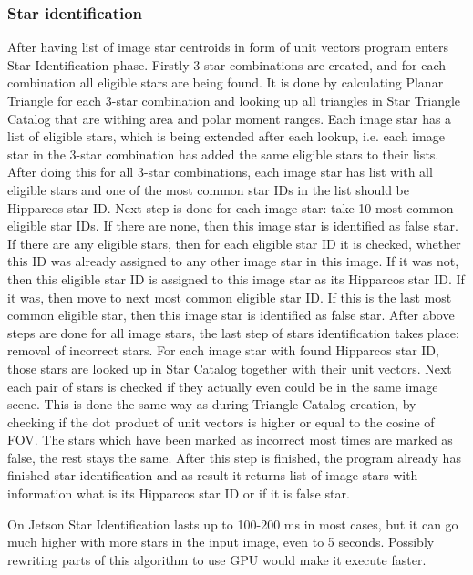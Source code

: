 \documentclass[12pt,a4paper,twoside]{article}
\begin{document}
\subsubsection{Star identification}
After having list of image star centroids in form of unit vectors program enters Star Identification phase. Firstly 3-star combinations are created, and for each combination all eligible stars are being found. It is done by calculating Planar Triangle for each 3-star combination and looking up all triangles in Star Triangle Catalog that are withing area and polar moment ranges. Each image star has a list of eligible stars, which is being extended after each lookup, i.e. each image star in the 3-star combination has added the same eligible stars to their lists. After doing this for all 3-star combinations, each image star has list with all eligible stars and one of the most common star IDs in the list should be Hipparcos star ID. Next step is done for each image star: take 10 most common eligible star IDs. If there are none, then this image star is identified as false star. If there are any eligible stars, then for each eligible star ID it is checked, whether this ID was already assigned to any other image star in this image. If it was not, then this eligible star ID is assigned to this image star as its Hipparcos star ID. If it was, then move to next most common eligible star ID. If this is the last most common eligible star, then this image star is identified as false star. After above steps are done for all image stars, the last step of stars identification takes place: removal of incorrect stars. For each image star with found Hipparcos star ID, those stars are looked up in Star Catalog together with their unit vectors. Next each pair of stars is checked if they actually even could be in the same image scene. This is done the same way as during Triangle Catalog creation, by checking if the dot product of unit vectors is higher or equal to the cosine of FOV. The stars which have been marked as incorrect most times are marked as false, the rest stays the same. After this step is finished, the program already has finished star identification and as result it returns list of image stars with information what is its Hipparcos star ID or if it is false star.

On Jetson Star Identification lasts up to 100-200 ms in most cases, but it can go much higher with more stars in the input image, even to 5 seconds. Possibly rewriting parts of this algorithm to use GPU would make it execute faster.
\end{document}
